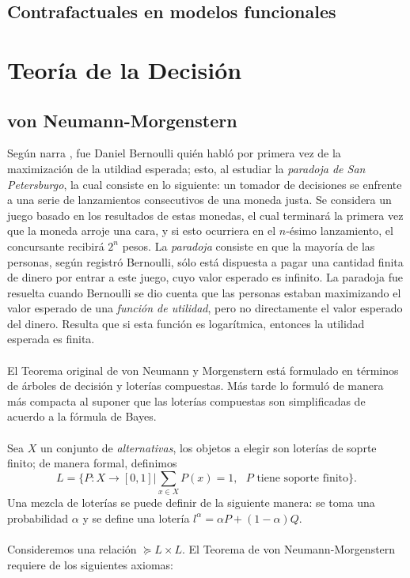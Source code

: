 \documentclass[11pt]{article}
\theoremstyle{plain}
\begin{document}
\subsection{Contrafactuales en modelos funcionales}

\section{Teoría de la Decisión}
\subsection{von Neumann-Morgenstern}
Según narra \cite{gilboa2009decision}, fue Daniel Bernoulli quién habló por primera vez de la maximización de la utildiad esperada; esto, al estudiar la \textit{paradoja de San Petersburgo}, la cual consiste en lo siguiente: un tomador de decisiones se enfrente a una serie de lanzamientos consecutivos de una moneda justa. Se considera un juego basado en los resultados de estas monedas, el cual terminará la primera vez que la moneda arroje una cara, y si esto ocurriera en el $n$-ésimo lanzamiento, el concursante recibirá $2^n$ pesos. La \textit{paradoja} consiste en que la mayoría de las personas, según registró Bernoulli, sólo está dispuesta a pagar una cantidad finita de dinero por entrar a este juego, cuyo valor esperado es infinito. La paradoja fue resuelta cuando Bernoulli se dio cuenta que las personas estaban maximizando el valor esperado de una \textit{función de utilidad}, pero no directamente el valor esperado del dinero. Resulta que si esta función es logarítmica, entonces la utilidad esperada es finita. \\
\\
El Teorema original de von Neumann y Morgenstern está formulado en términos de árboles de decisión y loterías compuestas. Más tarde \cite{jensen1967introduction} lo formuló de manera más compacta al suponer que las loterías compuestas son simplificadas de acuerdo a la fórmula de Bayes.\\
\\
Sea $X$ un conjunto de \textit{alternativas}, los objetos a elegir son loterías de soprte finito; de manera formal, definimos
\[ L = \{ P:X \to [0,1] | \sum_{x \in X} P(x) = 1, \textrm{ $P$ tiene soporte finito} \}. \]
Una mezcla de loterías se puede definir de la siguiente manera: se toma una probabilidad $\alpha$ y se define una lotería $l^\alpha = \alpha P + (1- \alpha) Q$.\\
\\
Consideremos una relación  $\succeq L \times L$. El Teorema de von Neumann-Morgenstern requiere de los siguientes axiomas:
\end{document}
